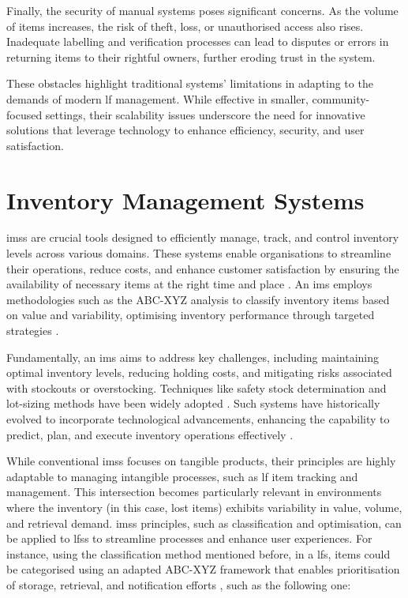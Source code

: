 Finally, the security of manual systems poses significant concerns. As the volume of items increases, the risk of theft, loss, or unauthorised access also rises. Inadequate labelling and verification processes can lead to disputes or errors in returning items to their rightful owners, further eroding trust in the system.

These obstacles highlight traditional systems' limitations in adapting to the demands of modern \ac{lf} management. While effective in smaller, community-focused settings, their scalability issues underscore the need for innovative solutions that leverage technology to enhance efficiency, security, and user satisfaction.



\section{Inventory Management Systems}

\ac{ims}s are crucial tools designed to efficiently manage, track, and control inventory levels across various domains. These systems enable organisations to streamline their operations, reduce costs, and enhance customer satisfaction by ensuring the availability of necessary items at the right time and place \cite{Pauliina2024}. An \ac{ims} employs methodologies such as the ABC-XYZ analysis to classify inventory items based on value and variability, optimising inventory performance through targeted strategies \cite{Pauliina2024}.

Fundamentally, an \ac{ims} aims to address key challenges, including maintaining optimal inventory levels, reducing holding costs, and mitigating risks associated with stockouts or overstocking. Techniques like safety stock determination and lot-sizing methods have been widely adopted \cite{Prabakaran2023}. Such systems have historically evolved to incorporate technological advancements, enhancing the capability to predict, plan, and execute inventory operations effectively \cite{Chebet2019}.

While conventional \ac{ims}s focuses on tangible products, their principles are highly adaptable to managing intangible processes, such as \ac{lf} item tracking and management. This intersection becomes particularly relevant in environments where the inventory (in this case, lost items) exhibits variability in value, volume, and retrieval demand. \ac{ims}s principles, such as classification and optimisation, can be applied to \ac{lfs}s to streamline processes and enhance user experiences. For instance, using the classification method mentioned before, in a \ac{lfs}, items could be categorised using an adapted ABC-XYZ framework that enables prioritisation of storage, retrieval, and notification efforts \cite{Khobragade2018}, such as the following one:

